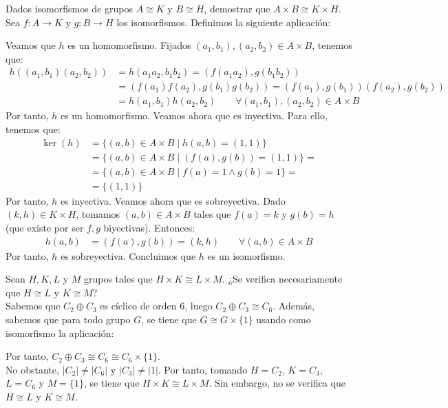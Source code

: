 \begin{ejercicio}
    Dados isomorfismos de grupos $A\cong K$ y $B\cong H$, demostrar que $A \times B\cong K\times H$.\\

    Sea $f:A\to K$ y $g:B\to H$ los isomorfismos. Definimos la siguiente aplicación:

    Veamos que $h$ es un homomorfismo. Fijados $(a_1,b_1),(a_2,b_2)\in A\times B$, tenemos que:
    \begin{align*}
        h((a_1,b_1)(a_2,b_2)) &= h(a_1a_2,b_1b_2) = (f(a_1a_2),g(b_1b_2))\\
        &= (f(a_1)f(a_2),g(b_1)g(b_2)) = (f(a_1),g(b_1))(f(a_2),g(b_2))\\
        &= h(a_1,b_1)h(a_2,b_2)\qquad \forall (a_1,b_1),(a_2,b_2)\in A\times B
    \end{align*}
    Por tanto, $h$ es un homomorfismo. Veamos ahora que es inyectiva. Para ello, tenemos que:
    \begin{align*}
        \ker(h) &= \{(a,b)\in A\times B\mid h(a,b)=(1,1)\}\\
        &= \{(a,b)\in A\times B\mid (f(a),g(b))=(1,1)\} =\\&= \{(a,b)\in A\times B\mid f(a)=1\wedge g(b)=1\} =\\&= \{(1,1)\}
    \end{align*}
    Por tanto, $h$ es inyectiva. Veamos ahora que es sobreyectiva. Dado $(k,h)\in K\times H$, tomamos $(a,b)\in A\times B$ tales que $f(a)=k$ y $g(b)=h$ (que existe por ser $f,g$ biyectivas). Entonces:
    \begin{align*}
        h(a,b) &= (f(a),g(b)) = (k,h) \qquad \forall (a,b)\in A\times B
    \end{align*}
    Por tanto, $h$ es sobreyectiva. Concluimos que $h$ es un isomorfismo.

\end{ejercicio}

\begin{ejercicio}
    Sean $H,K,L$ y $M$ grupos tales que $H\times K\cong L\times M$. ¿Se verifica necesariamente que $H\cong L$ y $K\cong M$?\\

    Sabemos que $C_2\oplus C_3$ es cíclico de orden $6$, luego $C_2\oplus C_3\cong C_6$. Además, sabemos que para todo grupo $G$, se tiene que $G\cong G\times \{1\}$ usando como isomorfismo la aplicación:

    Por tanto, $C_2\oplus C_3\cong C_6\cong C_6\times \{1\}$.\\

    No obstante, $|C_2|\neq |C_6|$ y $|C_3|\neq |1|$. Por tanto, tomando $H=C_2$, $K=C_3$, $L=C_6$ y $M=\{1\}$, se tiene que $H\times K\cong L\times M$. Sin embargo, no se verifica que $H\cong L$ y $K\cong M$.
\end{ejercicio}

